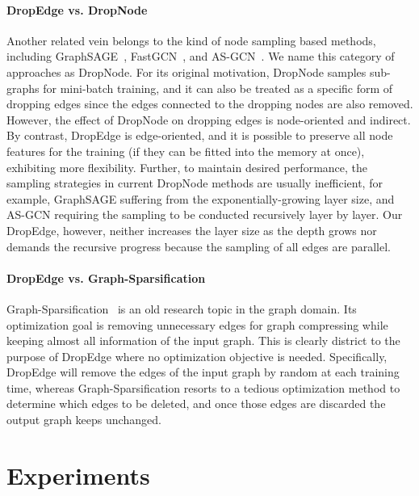 \documentclass{article}
\begin{document}
\paragraph{DropEdge vs. DropNode}
Another related vein belongs to the kind of node sampling based methods, including GraphSAGE~\citep{hamilton2017inductive}, FastGCN~\citep{chen2018fastgcn}, and AS-GCN~\citep{Huang2018}. We name this category of approaches as DropNode. For its original motivation, DropNode samples sub-graphs for mini-batch training, and it can also be treated as a specific form of dropping edges since the edges connected to the dropping nodes are also removed. However, the effect of DropNode on dropping edges is node-oriented and indirect. By contrast, DropEdge is edge-oriented, and it is possible to preserve all node features for the training (if they can be fitted into the memory at once), exhibiting more flexibility. Further, to maintain desired performance, the sampling strategies in current DropNode methods are usually inefficient, for example, GraphSAGE suffering from the exponentially-growing layer size, and AS-GCN requiring the sampling to be conducted recursively layer by layer. Our DropEdge, however, neither increases the layer size as the depth grows nor demands the recursive progress because the sampling of all edges are parallel.


\paragraph{DropEdge vs. Graph-Sparsification}
Graph-Sparsification~\citep{eppstein1997sparsification} is an old research topic in the graph domain. Its optimization goal is removing unnecessary edges for graph compressing while keeping almost all information of the input graph. This is clearly district to the purpose of DropEdge where no optimization objective is needed. Specifically, DropEdge will remove the edges of the input graph by random at each training time, whereas Graph-Sparsification resorts to a tedious optimization method  to determine which edges to be deleted, and once those edges are discarded the output graph keeps unchanged.



\section{Experiments}
\label{sec:exps}
\end{document}

